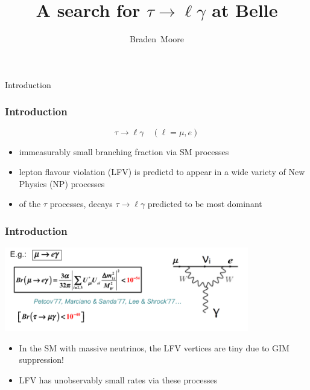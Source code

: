 \documentclass[xcolor=table]{beamer}
\title[Literature Review: $\tau\to\ell\gamma$ search] %
{A search for $\tau\to\ell\gamma$ at Belle}
\subtitle{}
\author[Braden Moore] %
{Braden~Moore}
\institute[] %
{
  School of Physics\\
  The University of Melbourne\\
  \vspace{0.5cm}
  Under the supervision of Dr. Phillip Urquijo
}
\date[19 May 2016] %
\begin{document}
 
\frame{\titlepage}
\fontsize{9pt}{14}\selectfont


\begin{frame}

\begin{center}
{\Huge Introduction}
\end{center}

\end{frame}


\begin{frame}
\frametitle{Introduction}

\begin{equation*}
\tau\to\ell\gamma\quad(\ell=\mu,e)
\end{equation*}
\begin{itemize}
\item immeasurably small branching fraction via SM processes
\item lepton flavour violation (LFV) is predictd to appear in a wide variety of New Physics (NP) processes
\item of the $\tau$ processes, decays $\tau\to\ell\gamma$ predicted to be most dominant
\end{itemize}


\end{frame}



\begin{frame}
\frametitle{Introduction}

\begin{center}
\includegraphics[width=0.8\textwidth]{images/tau-SM-BF.png}
\end{center}

\begin{itemize}
\item In the SM with massive neutrinos, the LFV vertices are tiny due to GIM suppression!
\item LFV has unobservably small rates via these processes
\end{itemize}



\end{frame}
\end{document}
